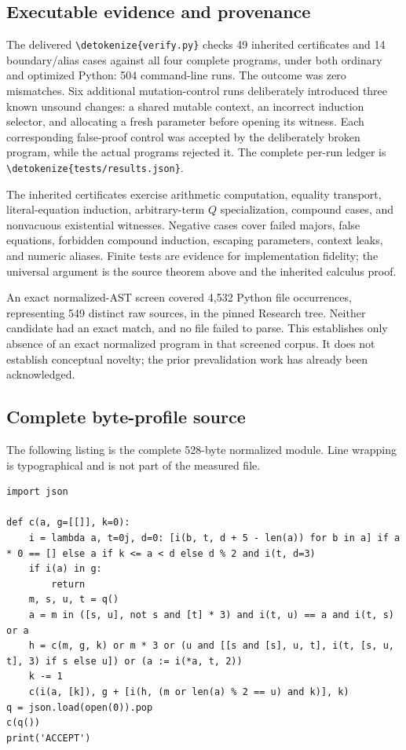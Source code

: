 \documentclass[11pt,letterpaper]{article}
\theoremstyle{definition}
\theoremstyle{remark}
\newcommand{\file}[1]{\expandafter\nolinkurl\expandafter{\detokenize{#1}}}
\begin{document}
\subsection{Executable evidence and provenance}

The delivered \file{verify.py} checks 49 inherited certificates and 14
boundary/alias cases against all four complete programs, under both
ordinary and optimized Python: 504 command-line runs. The outcome was
zero mismatches. Six additional mutation-control runs deliberately
introduced three known unsound changes: a shared mutable context,
an incorrect induction selector, and allocating a fresh parameter before
opening its witness. Each corresponding false-proof control was accepted
by the deliberately broken program, while the actual programs rejected it.
The complete per-run ledger is \file{tests/results.json}.

The inherited certificates exercise arithmetic computation, equality
transport, literal-equation induction, arbitrary-term $Q$ specialization,
compound cases, and nonvacuous existential witnesses. Negative cases cover
failed majors, false equations, forbidden compound induction, escaping
parameters, context leaks, and numeric aliases. Finite tests are evidence
for implementation fidelity; the universal argument is the source theorem
above and the inherited calculus proof.

An exact normalized-AST screen covered 4,532 Python file occurrences,
representing 549 distinct raw sources, in the pinned Research tree.
Neither candidate had an exact match, and no file failed to parse.
This establishes only absence of an exact normalized program in that
screened corpus. It does not establish conceptual novelty; the prior
prevalidation work has already been acknowledged.

\subsection{Complete byte-profile source}

The following listing is the complete 528-byte normalized module. Line
wrapping is typographical and is not part of the measured file.
\begin{lstlisting}
import json

def c(a, g=[[]], k=0):
    i = lambda a, t=0j, d=0: [i(b, t, d + 5 - len(a)) for b in a] if a * 0 == [] else a if k <= a < d else d % 2 and i(t, d=3)
    if i(a) in g:
        return
    m, s, u, t = q()
    a = m in ([s, u], not s and [t] * 3) and i(t, u) == a and i(t, s) or a
    h = c(m, g, k) or m * 3 or (u and [[s and [s], u, t], i(t, [s, u, t], 3) if s else u]) or (a := i(*a, t, 2))
    k -= 1
    c(i(a, [k]), g + [i(h, (m or len(a) % 2 == u) and k)], k)
q = json.load(open(0)).pop
c(q())
print('ACCEPT')
\end{lstlisting}
\end{document}
